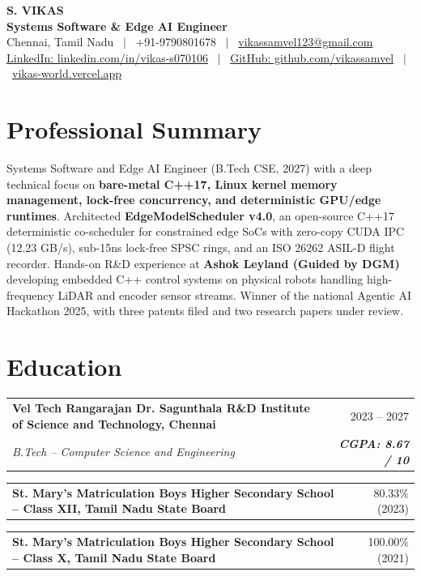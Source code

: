 \documentclass[10pt,a4paper]{article}
\makeatletter
\newcommand{\resumeSubheading}[4]{
\begin{tabular*}{\textwidth}{@{}l@{\extracolsep{\fill}}r@{}}
  \textbf{\small #1} & \small #2 \\
  \textit{\small #3} & \textit{\small #4} \\
\end{tabular*}\vspace{2.5pt}
}
\newcommand{\resumeSubheadingSimple}[2]{
\begin{tabular*}{\textwidth}{@{}l@{\extracolsep{\fill}}r@{}}
  \textbf{\small #1} & \small #2 \\
\end{tabular*}\vspace{2.5pt}
}
\makeatother
\begin{document}
\begin{center}
    {\Large \textbf{S. VIKAS}} \\[2pt]
    {\large \textbf{Systems Software \& Edge AI Engineer}} \\[2pt]
    {\footnotesize
    Chennai, Tamil Nadu \ $|$ \ +91-9790801678 \ $|$ \
    \href{mailto:vikassamvel123@gmail.com}{vikassamvel123@gmail.com} \\[1.5pt]
    \href{https://linkedin.com/in/vikas-s070106}{LinkedIn: linkedin.com/in/vikas-s070106}
    \ $|$ \
    \href{https://github.com/VIKASSAMVEL}{GitHub: github.com/vikassamvel}
    \ $|$ \
    \href{https://vikas-world.vercel.app/}{vikas-world.vercel.app}
    }
\end{center}

\vspace{-4pt}

\section*{Professional Summary}
\small
Systems Software and Edge AI Engineer (B.Tech CSE, 2027) with a deep technical focus on \textbf{bare-metal C++17, Linux kernel memory management, lock-free concurrency, and deterministic GPU/edge runtimes}. Architected \textbf{EdgeModelScheduler v4.0}, an open-source C++17 deterministic co-scheduler for constrained edge SoCs with zero-copy CUDA IPC (12.23 GB/s), sub-15ns lock-free SPSC rings, and an ISO 26262 ASIL-D flight recorder. Hands-on R\&D experience at \textbf{Ashok Leyland (Guided by DGM)} developing embedded C++ control systems on physical robots handling high-frequency LiDAR and encoder sensor streams. Winner of the national Agentic AI Hackathon 2025, with three patents filed and two research papers under review.

\section*{Education}
\resumeSubheading
  {Vel Tech Rangarajan Dr. Sagunthala R\&D Institute of Science and Technology, Chennai}{2023 -- 2027}
  {B.Tech -- Computer Science and Engineering}{\textbf{CGPA: 8.67 / 10}}
\resumeSubheadingSimple
  {St. Mary's Matriculation Boys Higher Secondary School -- Class XII, Tamil Nadu State Board}{80.33\% (2023)}
\resumeSubheadingSimple
  {St. Mary's Matriculation Boys Higher Secondary School -- Class X, Tamil Nadu State Board}{100.00\% (2021)}
\end{document}
